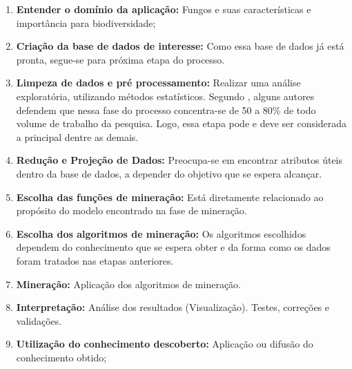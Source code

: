 \documentclass[tcc2,project]{classe_uftex/uftex}
\begin{document}
    \begin{enumerate}
        \item \textbf{Entender o domínio da aplicação:}
        Fungos e suas características e importância para biodiversidade;
        \item \textbf{Criação da base de dados de interesse:}
        Como essa base de dados já está pronta, segue-se para próxima etapa do processo.
        \item \textbf{Limpeza de dados e pré processamento:}
        Realizar uma análise exploratória, utilizando métodos estatísticos. Segundo , alguns autores defendem que nessa fase do processo concentra-se de 50 a 80\% de todo volume de trabalho da pesquisa. Logo, essa etapa pode e deve ser considerada a principal dentre as demais. %
        \item \textbf{Redução e Projeção de Dados:}
        Preocupa-se em encontrar atributos úteis dentro da base de dados, a depender do objetivo que se espera alcançar.
        \item \textbf{Escolha das funções de mineração:}
        Está diretamente relacionado ao propósito do modelo encontrado na fase de mineração.
        \item \textbf{Escolha dos algoritmos de mineração:}
        Os algoritmos escolhidos dependem do conhecimento que se espera obter e da forma como os dados foram tratados nas etapas anteriores.
        \item \textbf{Mineração:}
        Aplicação dos algoritmos de mineração.
        \item \textbf{Interpretação:}
        Análise dos resultados (Visualização). Testes, correções e validações.
        \item \textbf{Utilização do conhecimento descoberto:}
        Aplicação ou difusão do conhecimento obtido;
    \end{enumerate}
    
\end{document}
